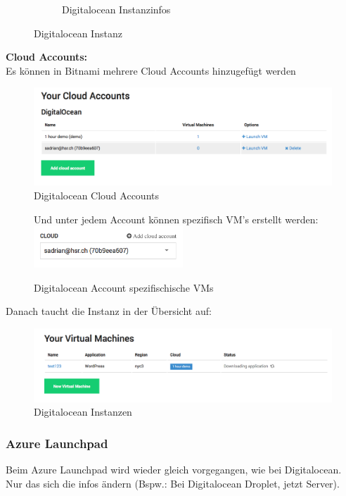 \begin{figure}[!htbp]
\begin{subfigure}[b]{.49\textwidth}
\caption{Digitalocean Instanzinfos}
\end{subfigure}
\caption{Digitalocean Instanz}
\end{figure}

\textbf{Cloud Accounts:}\\
Es können in Bitnami mehrere Cloud Accounts hinzugefügt werden

\begin{figure}[!htbp]
\includegraphics[width=\textwidth]{./03_Analyse/03_Bitnami/images/digitalocean_accounts}
\caption{Digitalocean Cloud Accounts}
\end{figure}



\begin{figure}[!htbp]
\centering
Und unter jedem Account können spezifisch VM's erstellt werden:\\
\includegraphics[width=0.5\textwidth]{./03_Analyse/03_Bitnami/images/digitalocean_account_specific}
\caption{Digitalocean Account spezifischische VMs}
\end{figure}


Danach taucht die Instanz in der Übersicht auf:
\begin{figure}[!htbp]
\includegraphics[width=\textwidth]{./03_Analyse/03_Bitnami/images/digitalocean_instances}
\caption{Digitalocean Instanzen}
\end{figure}

\newpage

\subsubsection{Azure Launchpad\autocite{azure}}
Beim Azure Launchpad wird wieder gleich vorgegangen, wie bei Digitalocean.
Nur das sich die infos ändern (Bspw.: Bei Digitalocean Droplet, jetzt Server).


